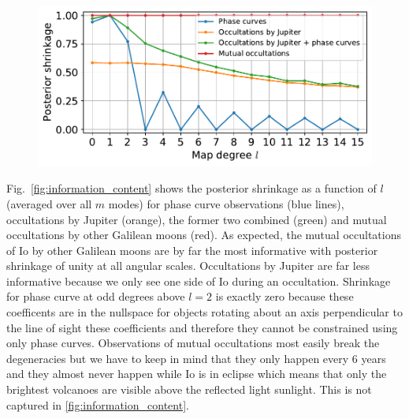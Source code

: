 \documentclass[modern]{aastex62}
\begin{document}
\begin{figure}[h!]
    \begin{centering}
    \includegraphics[width=\linewidth]{figures/information_content.pdf}
    \end{centering}
\end{figure}

Fig.~\ref{fig:information_content} shows the posterior shrinkage as a function of $l$ (averaged over all $m$ modes) for phase curve observations (blue lines), occultations by Jupiter (orange), the former two combined (green) and mutual occultations by other Galilean moons (red).
As expected, the mutual occultations of Io by other Galilean moons are by far the most informative with posterior shrinkage of unity at all angular scales. 
Occultations by Jupiter are far less informative because we only see one side of Io during an occultation.
Shrinkage for phase curve at odd degrees above $l=2$ is exactly zero because these coefficents are in the nullspace for objects rotating about an axis perpendicular to the line of sight these coefficients and therefore they cannot be constrained using only phase curves. 
Observations of mutual occultations most easily break the degeneracies but we have to keep in mind that they only happen every 6 years and they almost never happen while Io is in eclipse which means that only the brightest volcanoes are visible above the reflected light sunlight.
This is not captured in \ref{fig:information_content}. 
\end{document}
